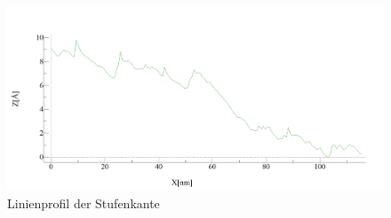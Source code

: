 \begin{figure}
	\centering
	\includegraphics[width=\textwidth]{profil}
	\caption{Linienprofil der Stufenkante}
	\label{fig:profil}
\end{figure}